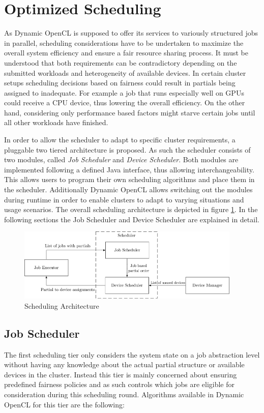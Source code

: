 \section{Optimized Scheduling}

As Dynamic OpenCL is supposed to offer its services to variously structured jobs in parallel, scheduling considerations have to be undertaken to maximize the overall system efficiency and ensure a fair resource sharing process. It must be understood that both requirements can be contradictory depending on the submitted workloads and heterogeneity of available devices. In certain cluster setups scheduling decisions based on fairness could result in partials being assigned to inadequate. For example a job that runs especially well on GPUs could receive a CPU device, thus lowering the overall efficiency. On the other hand, considering only performance based factors might starve certain jobs until all other workloads have finished.

In order to allow the scheduler to adapt to specific cluster requirements, a pluggable two tiered architecture is proposed. As such the scheduler consists of two modules, called \textit{Job Scheduler} and \textit{Device Scheduler}. Both modules are implemented following a defined Java interface, thus allowing interchangeability. This allows users to program their own scheduling algorithms and place them in the scheduler. Additionally Dynamic OpenCL allows switching out the modules during runtime in order to enable clusters to adapt to varying situations and usage scenarios. The overall scheduling architecture is depicted in figure \ref{img:scheduling_arch}. In the following sections the Job Scheduler and Device Scheduler are explained in detail.

\begin{figure}[!htb]
	\includegraphics[width=0.95\textwidth]{drawings/scheduling_arch.pdf}
	\centering
	\caption{Scheduling Architecture}
	\label{img:scheduling_arch}
\end{figure}

\subsection{Job Scheduler}
The first scheduling tier only considers the system state on a job abstraction level without having any knowledge about the actual partial structure or available devices in the cluster. Instead this tier is mainly concerned about ensuring predefined fairness policies and as such controls which jobs are eligible for consideration during this scheduling round. Algorithms available in Dynamic OpenCL for this tier are the following:

